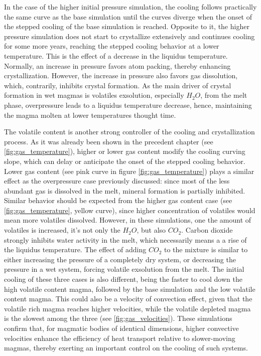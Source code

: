 In the case of the higher initial pressure simulation, the cooling follows practically the same curve as the base simulation until the curves diverge when the onset of the stepped cooling of the base simulation is reached. Opposite to it, the higher pressure simulation does not start to crystallize extensively and continues cooling for some more years, reaching the stepped cooling behavior at a lower temperature. This is the effect of a decrease in the liquidus temperature. Normally, an increase in pressure favors atom packing, thereby enhancing crystallization. However, the increase in pressure also favors gas dissolution, which, contrarily, inhibits crystal formation. As the main driver of crystal formation in wet magmas is volatiles exsolution, especially $H_2O$, from the melt phase, overpressure leads to a liquidus temperature decrease, hence, maintaining the magma molten at lower temperatures thought time.

The volatile content is another strong controller of the cooling and crystallization process. As it was already been shown in the precedent chapter (see \ref{fig:gas_temperature}), higher or lower gas content modify the cooling curving slope, which can delay or anticipate the onset of the stepped cooling behavior. Lower gas content (see pink curve in figure \ref{fig:gas_temperature}) plays a similar effect as the overpressure case previously discussed: since most of the less abundant gas is dissolved in the melt, mineral formation is partially inhibited. Similar behavior should be expected from the higher gas content case (see \ref{fig:gas_temperature}, yellow curve), since higher concentration of volatiles would mean more volatiles dissolved. However, in these simulations, one the amount of volatiles is increased, it's not only the $H_2O$, but also $CO_2$. Carbon dioxide strongly inhibits water activity in the melt, which necessarily means a a rise of the liquidus temperature. The effect of adding $CO_2$ to the mixture is similar to either increasing the pressure of a completely dry system, or decreasing the pressure in a wet system, forcing volatile exsolution from the melt. The initial cooling of these three cases is also different, being the faster to cool down the high volatile content magma, followed by the base simulation and the low volatile content magma. This could also be a velocity of convection effect, given that the volatile rich magma reaches higher velocities, while the volatile depleted magma is the slowest among the three (see \ref{fig:gas_velocities}). These simulations confirm that, for magmatic bodies of identical dimensions, higher convective velocities enhance the efficiency of heat transport relative to slower-moving magmas, thereby exerting an important control on the cooling of such systems. 

